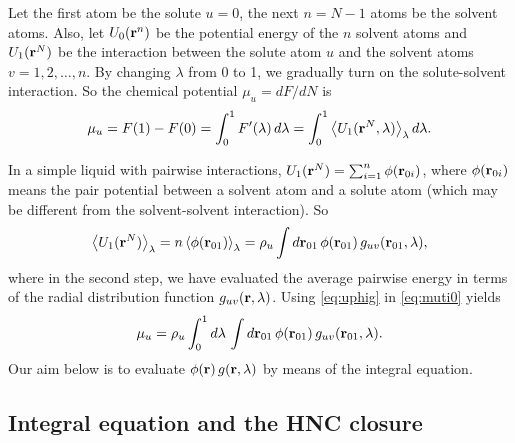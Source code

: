 \documentclass[12pt]{article}
\begin{document}
Let the first atom be the solute $u = 0$,
  the next $n = N - 1$ atoms be the solvent atoms.
Also,
  let $U_0(\mathbf{r}^n)$ be the potential energy of the $n$ solvent atoms
  and $U_1(\mathbf{r}^N)$ be the interaction between the solute atom $u$
  and the solvent atoms $v = 1, 2, \dots, n$.
By changing $\lambda$ from 0 to 1, we gradually turn on
  the solute-solvent interaction.
%
So the chemical potential $\mu_u = dF/dN$ is
\begin{align}
  \mu_u
  =
  F(1) - F(0)
  =
  \int_0^1 F'(\lambda) \, d\lambda
  =
  \int_0^1
    \left\langle
      U_1(\mathbf{r}^N, \lambda)
    \right\rangle_\lambda d\lambda.
  \label{eq:muti0}
\end{align}




In a simple liquid with pairwise interactions,
  $U_1(\mathbf{r}^N) = \sum_{i = 1}^{n} \phi(\mathbf{r}_{0i})$,
  where $\phi(\mathbf{r}_{0i})$ means the pair potential
  between a solvent atom and a solute atom
  (which may be different from the solvent-solvent
  interaction).
So
\begin{equation}
    \left\langle
      U_1(\mathbf{r}^N)
    \right\rangle_\lambda
    =
    n
    \left\langle
      \phi(\mathbf{r}_{01})
    \right\rangle_\lambda
    =
    \rho_u \int d\mathbf{r}_{01} \,
      \phi(\mathbf{r}_{01}) \, g_{uv}(\mathbf{r}_{01}, \lambda),
  \label{eq:uphig}
\end{equation}
%
where in the second step, we have evaluated the average
pairwise energy in terms of the radial distribution function
$g_{uv}(\mathbf{r}, \lambda)$.
Using \eqref{eq:uphig} in \eqref{eq:muti0} yields
\begin{equation}
    \mu_u
    =
    \rho_u
    \int_0^1 d\lambda \,
      \int d\mathbf{r}_{01} \,
        \phi(\mathbf{r}_{01}) \, g_{uv}(\mathbf{r}_{01}, \lambda).
  \label{eq:muti}
\end{equation}
Our aim below is to evaluate
$\phi(\mathbf{r}) \, g(\mathbf{r}, \lambda)$
by means of the integral equation.



\subsection{Integral equation and the HNC closure}
\end{document}
